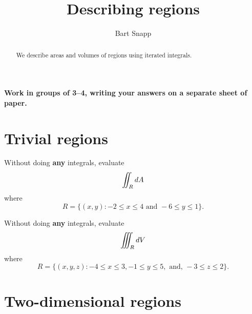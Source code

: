 \documentclass[handout,nooutcomes,noauthor]{ximera}
\author{Bart Snapp}
\title[Collaborate:]{Describing regions}
\begin{document}
\begin{abstract}
  We describe areas and volumes of regions using iterated integrals.
\end{abstract}
\maketitle

\textbf{Work in groups of 3--4, writing your answers on a separate
  sheet of paper.}

\section{Trivial regions}


\begin{problem}
  Without doing \textbf{any} integrals, evaluate
  \[
  \iint_R \mathop{}\!d A
  \]
  where
  \[
  R =\{(x,y):-2\le x\le 4 \text{ and } -6\le y\le 1\}.
  \]
\end{problem}


\begin{problem}
  Without doing \textbf{any} integrals, evaluate
  \[
  \iiint_R \mathop{}\!d V
  \]
  where
  \[
  R =\{(x,y,z):-4\le x\le 3, 
    -1\le y\le 5,\text{ and, } -3\le z\le 2\}.
  \]
\end{problem}

\section{Two-dimensional regions}
\end{document}
